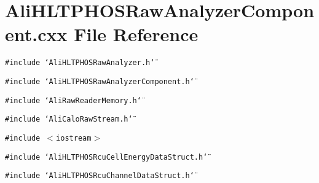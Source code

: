 \section{Ali\-HLTPHOSRaw\-Analyzer\-Component.cxx File Reference}
\label{AliHLTPHOSRawAnalyzerComponent_8cxx}


{\tt \#include \char`\"{}Ali\-HLTPHOSRaw\-Analyzer.h\char`\"{}}\par
{\tt \#include \char`\"{}Ali\-HLTPHOSRaw\-Analyzer\-Component.h\char`\"{}}\par
{\tt \#include \char`\"{}Ali\-Raw\-Reader\-Memory.h\char`\"{}}\par
{\tt \#include \char`\"{}Ali\-Calo\-Raw\-Stream.h\char`\"{}}\par
{\tt \#include $<$iostream$>$}\par
{\tt \#include \char`\"{}Ali\-HLTPHOSRcu\-Cell\-Energy\-Data\-Struct.h\char`\"{}}\par
{\tt \#include \char`\"{}Ali\-HLTPHOSRcu\-Channel\-Data\-Struct.h\char`\"{}}\par
